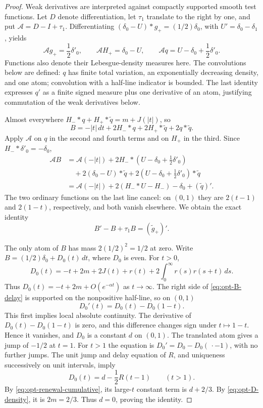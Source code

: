 \documentclass[10pt]{article}
\numberwithin{equation}{section}
\theoremstyle{remark}
\begin{document}
\begin{proof}
Weak derivatives are interpreted against compactly supported smooth
test functions. Let $D$ denote differentiation, let $\tau_1$ translate
to the right by one, and put $\mathcal A=D-I+\tau_1$.
Differentiating $(\delta_0-U)*g_+=(1/2)\delta_0$, with
$U'=\delta_0-\delta_1$, yields
\[
 \mathcal A g_+=\frac12\delta'_0,\qquad
 \mathcal A H_+=\delta_0-U,\qquad
 \mathcal A q=U-\delta_0+\frac12\delta'_0.
\]
Functions also denote their Lebesgue-density measures here. The
convolutions below are defined: $q$ has finite total variation, an
exponentially decreasing density, and one atom; convolution with a
half-line indicator is bounded. The last identity expresses $q'$ as
a finite signed measure plus one derivative of an atom, justifying
commutation of the weak derivatives below.

Almost everywhere $H_-*q+H_+*\widetilde q=m+J(|t|)$, so
\[
 B=-|t|\,dt+2H_-*q+2H_+*\widetilde q+2q*\widetilde q.
\]
Apply $\mathcal A$ on $q$ in the second and fourth terms and on
$H_+$ in the third. Since $H_-*\delta'_0=-\delta_0$,
\begin{align*}
 \mathcal A B
 &=\mathcal A(-|t|)+2H_-*(U-\delta_0+\tfrac12\delta'_0)\\
 &\quad+2(\delta_0-U)*\widetilde q
      +2(U-\delta_0+\tfrac12\delta'_0)*\widetilde q\\
 &=\mathcal A(-|t|)+2(H_-*U-H_-)-\delta_0+(\widetilde q)'.
\end{align*}
The two ordinary functions on the last line cancel: on $(0,1)$ they
are $2(t-1)$ and $2(1-t)$, respectively, and both vanish elsewhere.
We obtain the exact identity
\begin{equation}
 B'-B+\tau_1B=(\widetilde g_+)'.
 \label{eq:opt-B-delay}
\end{equation}

The only atom of $B$ has mass $2(1/2)^2=1/2$ at zero. Write
$B=(1/2)\delta_0+D_0(t)\,dt$, where $D_0$ is even. For $t>0$,
\begin{equation}
 D_0(t)=-t+2m+2J(t)+r(t)
           +2\int_0^\infty r(s)r(s+t)\,ds.
 \label{eq:opt-D-density}
\end{equation}
Thus $D_0(t)=-t+2m+O(e^{-\alpha t})$ as $t\to\infty$.
The right side of \eqref{eq:opt-B-delay} is supported on the
nonpositive half-line, so on $(0,1)$
\[
 D_0'(t)=D_0(t)-D_0(1-t).
\]
This first implies local absolute continuity. The derivative of
$D_0(t)-D_0(1-t)$ is zero, and this difference changes sign under
$t\mapsto1-t$. Hence it vanishes, and $D_0$ is a constant $d$ on
$(0,1)$. The translated atom gives a jump of $-1/2$ at $t=1$.
For $t>1$ the equation is $D_0'=D_0-D_0(\,\cdot-1)$, with no
further jumps. The unit jump and delay equation of $R$, and uniqueness
successively on unit intervals, imply
\[
 D_0(t)=d-\frac12R(t-1)\qquad(t>1).
\]
By \eqref{eq:opt-renewal-cumulative}, its large-$t$ constant term is
$d+2/3$. By \eqref{eq:opt-D-density}, it is $2m=2/3$. Thus $d=0$,
proving the identity.
\end{proof}
\end{document}
